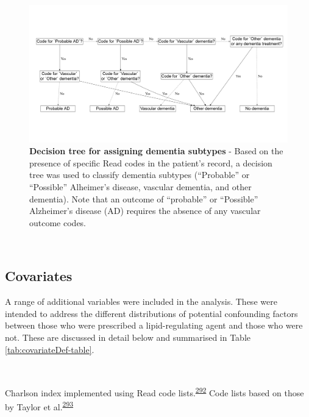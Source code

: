 \documentclass[a4paper, twoside]{templates/ociamthesis}
\begin{document}
\begin{figure}[H]
\includegraphics[width=1\linewidth]{figures/cprd-analysis/decision_tree} \caption[Decision tree for assigning dementia subtypes]{\textbf{Decision tree for assigning dementia subtypes} - Based on the presence of specific Read codes in the patient's record, a decision tree was used to classify dementia subtypes (``Probable'' or ``Possible'' Alheimer's disease, vascular dementia, and other dementia). Note that an outcome of ``probable'' or ``Possible'' Alzheimer's disease (AD) requires the absence of any vascular outcome codes.}\label{fig:decisionTreeFig}
\end{figure}

~

\hypertarget{covariates}{%
\subsection{Covariates}\label{covariates}}

A range of additional variables were included in the analysis. These were intended to address the different distributions of potential confounding factors between those who were prescribed a lipid-regulating agent and those who were not. These are discussed in detail below and summarised in Table \ref{tab:covariateDef-table}.

~









Charlson index implemented using Read code lists.\textsuperscript{\protect\hyperlink{ref-khan2010}{292}} Code lists based on those by Taylor et al.\textsuperscript{\protect\hyperlink{ref-taylor2016}{293}}
\end{document}
